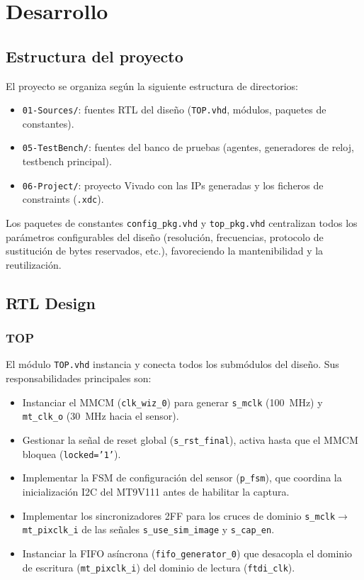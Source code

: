 \documentclass[../main.tex]{subfiles}
\begin{document}
\chapter{Desarrollo}
\label{chap:desarrollo}

\section{Estructura del proyecto}

El proyecto se organiza según la siguiente estructura de directorios:

\begin{itemize}
    \item \texttt{01-Sources/}: fuentes RTL del diseño (\texttt{TOP.vhd}, módulos, paquetes de constantes).
    \item \texttt{05-TestBench/}: fuentes del banco de pruebas (agentes, generadores de reloj, testbench principal).
    \item \texttt{06-Project/}: proyecto Vivado con las IPs generadas y los ficheros de constraints (\texttt{.xdc}).
\end{itemize}

Los paquetes de constantes \texttt{config\_pkg.vhd} y \texttt{top\_pkg.vhd} centralizan todos los parámetros configurables del diseño (resolución, frecuencias, protocolo de sustitución de bytes reservados, etc.), favoreciendo la mantenibilidad y la reutilización.

\section{RTL Design}

\subsection{TOP}

El módulo \texttt{TOP.vhd} instancia y conecta todos los submódulos del diseño. Sus responsabilidades principales son:

\begin{itemize}
    \item Instanciar el MMCM (\texttt{clk\_wiz\_0}) para generar \texttt{s\_mclk} (100~MHz) y \texttt{mt\_clk\_o} (30~MHz hacia el sensor).
    \item Gestionar la señal de reset global (\texttt{s\_rst\_final}), activa hasta que el MMCM bloquea (\texttt{locked='1'}).
    \item Implementar la FSM de configuración del sensor (\texttt{p\_fsm}), que coordina la inicialización I2C del MT9V111 antes de habilitar la captura.
    \item Implementar los sincronizadores 2FF para los cruces de dominio \texttt{s\_mclk}$\rightarrow$\texttt{mt\_pixclk\_i} de las señales \texttt{s\_use\_sim\_image} y \texttt{s\_cap\_en}.
    \item Instanciar la FIFO asíncrona (\texttt{fifo\_generator\_0}) que desacopla el dominio de escritura (\texttt{mt\_pixclk\_i}) del dominio de lectura (\texttt{ftdi\_clk}).
\end{itemize}
\end{document}
